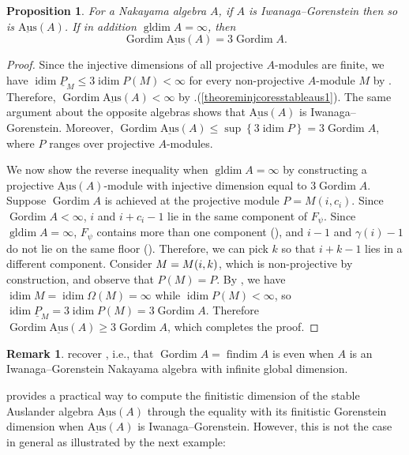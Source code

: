 \documentclass[a4paper]{amsart}
\newtheorem{proposition}[theorem]{Proposition}
\theoremstyle{definition}
\newtheorem{remark}[theorem]{Remark}
\theoremstyle{remark}
\numberwithin{equation}{theorem}
\newcommand{\findim}{\operatorname{findim}}
\newcommand{\sAus}{\operatorname{\underline{Aus}}}
\newcommand{\pstab}[1]{\underline{P}_{#1}}
\newcommand{\gordim}{\operatorname{Gordim}}
\newcommand{\idim}{\operatorname{idim}}
\newcommand{\gldim}{\operatorname{gldim}}
\newcommand{\psiforest}{F_\psi}
\begin{document}
\begin{proposition}\label{prop:iwanaga-gorenstein}
    For a Nakayama algebra $A$, if $ A $ is Iwanaga--Gorenstein then so is $\sAus (A) $.  If in addition $\gldim A = \infty$, then $$\gordim \sAus (A) = 3 \gordim A.$$
\end{proposition}
\begin{proof}\label{proof:iwanaga-gorenstein}
Since the injective dimensions of all projective $ A $-modules are finite, we have $\idim \pstab M  \leq 3 \idim P(M) < \infty$ for every non-projective $ A $-module $ M $ by . Therefore, $\gordim \sAus (A) < \infty $ by .(\ref{theoreminjcoresstableaus1}). The same argument about the opposite algebras shows that $ \sAus(A) $ is Iwanaga--Gorenstein.
Moreover, $\gordim \sAus (A) \leq \sup\left\{ 3 \idim P \right\} = 3\gordim A$, where $ P $ ranges over projective $ A $-modules.

We now show the reverse inequality when $ \gldim A = \infty $ by constructing a projective $\sAus (A) $-module with injective dimension equal to $3 \gordim A$.
Suppose $\gordim A$ is achieved at the projective module $P = M(i, c_i)$.
Since $\gordim A < \infty$, $i$ and $i + c_i - 1$ lie in the same component of $ \psiforest $.
Since $\gldim A = \infty$, $\psiforest$ contains more than one component (), and $ i-1 $ and $ \gamma(i)-1 $ do not lie on the same floor
().
Therefore, we can pick $k$ so that $i + k - 1$ lies in a different component.
Consider $M = \mik$, which is non-projective by construction, and observe that $P(M) = P$.
By , we have $\idim{M} = \idim{\Omega(M)} = \infty$ while $\idim{P(M)} < \infty$, so $\idim \pstab{M} = 3\idim{P(M)} = 3\gordim A$.
Therefore $\gordim \sAus(A) \geq 3 \gordim A$, which completes the proof.
\end{proof}

\begin{remark}
     recover \cite[Corollary 3.26]{Se2}, i.e., that $ \gordim A = \findim A $ is even when $ A $ is an Iwanaga--Gorenstein Nakayama algebra with infinite global dimension.
\end{remark}

 provides a practical way to compute the finitistic dimension of the stable Auslander algebra $ \sAus(A) $ through the equality with its finitistic Gorenstein dimension when $ \sAus(A) $ is Iwanaga--Gorenstein. However, this is not the case in general as illustrated by the next example:
\end{document}

